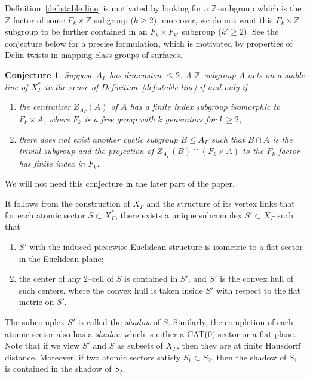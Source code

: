 \documentclass[11pt]{amsart}
\newtheorem{conj}[theorem]{Conjecture}
\theoremstyle{definition}
\newcommand{\Xa}{X^{\ast}}
\begin{document}
Definition~\ref{def:stable line} is motivated by looking for a $\mathbb Z$--subgroup which is the $\mathbb Z$ factor of some $F_k\times \mathbb Z$ subgroup ($k\ge 2$), moreover, we do not want this $F_k\times \mathbb Z$ subgroup to be further contained in an $F_k\times F_{k'}$ subgroup ($k'\ge 2$). See the conjecture below for a precise formulation, which is motivated by properties of Dehn twists in mapping class groups of surfaces. 

\begin{conj}
	\label{c:Zstable}
Suppose $A_\Gamma$ has dimension $\le 2$. A $\mathbb Z$--subgroup $A$ acts on a stable line of $\Xa_\Gamma$ in the sense of Definition~\ref{def:stable line} if and only if 
\begin{enumerate}
	\item the centralizer $Z_{A_\Gamma}(A)$ of $A$ has a finite index subgroup isomorphic to $F_k\times A$, where $F_k$ is a free group with $k$ generators for $k\ge 2$;
	\item there does not exist another cyclic subgroup $B\le A_\Gamma$ such that $B\cap A$ is the trivial subgroup and the projection of $Z_{A_\Gamma}(B)\cap(F_k\times A)$ to the $F_k$ factor has finite index in $F_k$.
\end{enumerate}
\end{conj}
We will not need this conjecture in the later part of the paper.

It follows from the construction of $X_\Gamma$ and the structure of its vertex links that for each atomic sector $S\subset \Xa_\Gamma$, there exists a unique subcomplex $S'\subset X_\Gamma$ such that
\begin{enumerate}
	\item $S'$ with the induced piecewise Euclidean structure is isometric to a flat sector in the Euclidean plane;
	\item the center of any $2$--cell of $S$ is contained in $S'$, and $S'$ is the convex hull of such centers, where the convex hull is taken inside $S'$ with respect to the flat metric on $S'$.
\end{enumerate}
The subcomplex $S'$ is called the \emph{shadow} of $S$. Similarly, the completion of each atomic sector also has a \emph{shadow} which is either a CAT(0) sector or a flat plane. Note that if we view $S'$ and $S$ as subsets of $X_\Gamma$, then they are at finite Hausdorff distance. Moreover, if two atomic sectors satisfy $S_1\subset S_2$, then the shadow of $S_1$ is contained in the shadow of $S_2$. 
\end{document}
